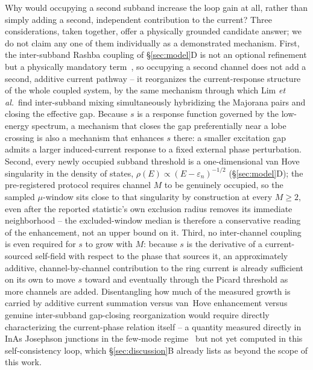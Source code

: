 \documentclass[aps,physrev,reprint,superscriptaddress,amsmath,amssymb,floatfix]{revtex4-2}
\begin{document}
Why would occupying a second subband increase the loop gain at all,
rather than simply adding a second, independent contribution to the
current? Three considerations, taken together, offer a physically
grounded candidate answer; we do not claim any one of them individually
as a demonstrated mechanism. First, the inter-subband Rashba coupling of
\S\ref{sec:model}D is not an optional refinement but a physically
mandatory term~\cite{lim2012}, so occupying a second channel does not add
a second, additive current pathway -- it reorganizes the current-response
structure of the whole coupled system, by the same mechanism through
which Lim \emph{et al.}\ find inter-subband mixing simultaneously
hybridizing the Majorana pairs and closing the effective gap. Because $s$
is a response function governed by the low-energy spectrum, a mechanism
that closes the gap preferentially near a lobe crossing is also a
mechanism that enhances $s$ there: a smaller excitation gap admits a
larger induced-current response to a fixed external phase perturbation.
Second, every newly occupied subband threshold is a one-dimensional van
Hove singularity in the density of states, $\rho(E)\propto(E-\varepsilon_n)^{-1/2}$
(\S\ref{sec:model}D); the pre-registered protocol requires channel $M$ to
be genuinely occupied, so the sampled $\mu$-window sits close to that
singularity by construction at every $M\geq2$, even after the reported
statistic's own exclusion radius removes its immediate neighborhood --
the excluded-window median is therefore a conservative reading of the
enhancement, not an upper bound on it. Third, no inter-channel coupling
is even required for $s$ to grow with $M$: because $s$ is the derivative
of a current-sourced self-field with respect to the phase that sources
it, an approximately additive, channel-by-channel contribution to the
ring current is already sufficient on its own to move $s$ toward and
eventually through the Picard threshold as more channels are added.
Disentangling how much of the measured growth is carried by additive
current summation versus van~Hove enhancement versus genuine
inter-subband gap-closing reorganization would require directly
characterizing the current-phase relation itself -- a quantity measured
directly in InAs Josephson junctions in the few-mode
regime~\cite{hart2019currentphase} but not yet computed in this
self-consistency loop, which \S\ref{sec:discussion}B already lists as
beyond the scope of this work.
\end{document}
